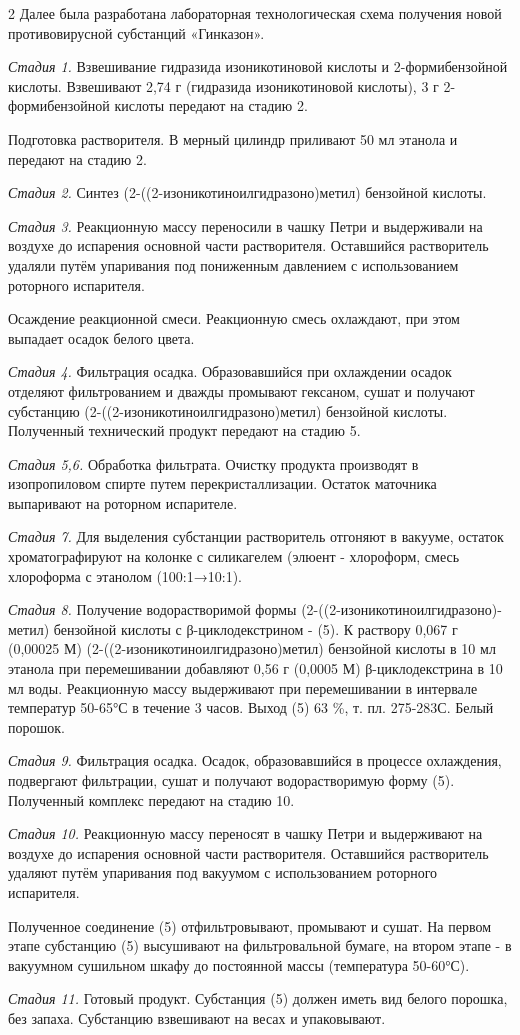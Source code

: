\begin{multicols}{2}
Далее была разработана лабораторная технологическая схема получения
новой противовирусной субстанций «Гинказон».

\emph{Стадия 1.} Взвешивание гидразида изоникотиновой кислоты и
2-формибензойной кислоты. Взвешивают 2,74 г (гидразида изоникотиновой
кислоты), 3 г 2-формибензойной кислоты передают на стадию 2.

Подготовка растворителя. В мерный цилиндр приливают 50 мл этанола и
передают на стадию 2.

\emph{Стадия 2.} Синтез (2-((2-изоникотиноилгидра\-зоно)метил) бензойной
кислоты.

\emph{Стадия 3.} Реакционную массу переносили в чашку Петри и
выдерживали на воздухе до испарения основной части растворителя.
Оставшийся растворитель удаляли путём упаривания под пониженным
давлением с использованием роторного испарителя.

Осаждение реакционной смеси. Реакционную смесь охлаждают, при этом
выпадает осадок белого цвета.

\emph{Стадия 4.} Фильтрация осадка. Образовавшийся при охлаждении осадок
отделяют фильтрованием и дважды промывают гексаном, сушат и получают
субстанцию (2-((2-изоникотиноилгидразоно)метил) бензойной кислоты.
Полученный технический продукт передают на стадию 5.

\emph{Стадия 5,6.} Обработка фильтрата. Очистку продукта производят в
изопропиловом спирте путем перекристаллизации. Остаток маточника
выпаривают на роторном испарителе.

\emph{Стадия 7.} Для выделения субстанции растворитель отгоняют в
вакууме, остаток хроматографируют на колонке с силикагелем (элюент -
хлороформ, смесь хлороформа с этанолом (100:1→10:1).

\emph{Стадия 8.} Получение водорастворимой формы
(2-((2-изоникотиноилгидразоно)- метил) бензойной кислоты с
β-циклодекстрином - (5). К раствору 0,067 г (0,00025 М)
(2-((2-изоникотиноилгидразоно)метил) бензойной кислоты в 10 мл этанола
при перемешивании добавляют 0,56 г (0,0005 М) β-циклодекстрина в 10 мл
воды. Реакционную массу выдерживают при перемешивании в интервале
температур 50-65°С в течение 3 часов. Выход (5) 63 \%, т. пл.
275-283С. Белый порошок.

\emph{Стадия 9.} Фильтрация осадка. Осадок, образовавшийся в процессе
охлаждения, подвергают фильтрации, сушат и получают водорастворимую
форму (5). Полученный комплекс передают на стадию 10.

\emph{Стадия 10.} Реакционную массу переносят в чашку Петри и
выдерживают на воздухе до испарения основной части растворителя.
Оставшийся растворитель удаляют путём упаривания под вакуумом с
использованием роторного испарителя.

Полученное соединение (5) отфильтровывают, промывают и сушат. На первом
этапе субстанцию (5) высушивают на фильтровальной бумаге, на втором
этапе - в вакуумном сушильном шкафу до постоянной массы (температура
50-60°С).

\emph{Стадия 11.} Готовый продукт. Субстанция (5) должен иметь вид
белого порошка, без запаха. Субстанцию взвешивают на весах и
упаковывают.
\end{multicols}

